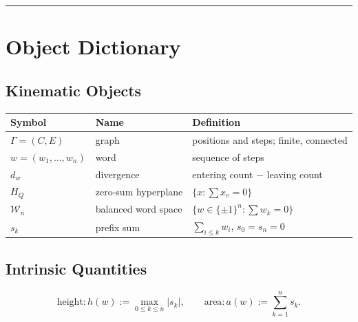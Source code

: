 \documentclass[
  11pt,
]{article}
\newcounter{none} %
\begin{document}
\begin{center}\rule{0.5\linewidth}{0.5pt}\end{center}

\section{Object Dictionary}\label{object-dictionary}

\subsection{Kinematic Objects}\label{kinematic-objects}

{\def\LTcaptype{none} %
\begin{longtable}[]{@{}
  >{\raggedright\arraybackslash}p{}
  >{\raggedright\arraybackslash}p{}
  >{\raggedright\arraybackslash}p{}@{}}
\toprule\noalign{}
\begin{minipage}[b]{\linewidth}\raggedright
Symbol
\end{minipage} & \begin{minipage}[b]{\linewidth}\raggedright
Name
\end{minipage} & \begin{minipage}[b]{\linewidth}\raggedright
Definition
\end{minipage} \\
\midrule\noalign{}
\endhead
\bottomrule\noalign{}
\endlastfoot
\(\Gamma=(C,E)\) & graph & positions and steps; finite, connected \\
\(w=(w_1,\dots,w_n)\) & word & sequence of steps \\
\(d_w\) & divergence & entering count \(-\) leaving count \\
\(H_Q\) & zero-sum hyperplane & \(\{x:\sum x_v=0\}\) \\
\(\mathcal{W}_n\) & balanced word space &
\(\{w\in\{\pm1\}^n:\sum w_k=0\}\) \\
\(s_k\) & prefix sum & \(\sum_{i\le k}w_i\), \(s_0=s_n=0\) \\
\end{longtable}
}

\subsection{Intrinsic Quantities}\label{intrinsic-quantities}

\[
\text{height}: h(w):=\max_{0\le k\le n}|s_k|, \qquad
\text{area}: a(w):=\sum_{k=1}^n s_k.
\tag{5.1}
\]
\end{document}
